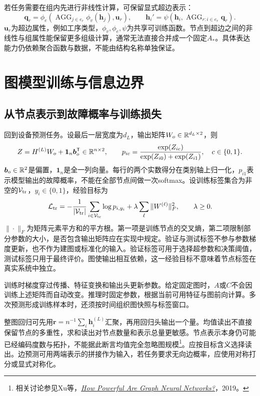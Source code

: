 若任务需要在组内先进行非线性计算，可保留显式超边表示：
\begin{equation}
 \bm q_r=\phi_e\!\left(\operatorname{AGG}_{j\in e_r}\phi_v(\bm h_j),\bm u_r\right),\qquad
 \bm h_i'=\psi\!\left(\bm h_i,\operatorname{AGG}_{r:i\in e_r}\bm q_r\right).
\end{equation}
$\bm u_r$为超边属性，例如工序类型，$\phi_v,\phi_e,\psi$为共享可训练函数。节点到超边之间的非线性与组属性能保留更多组级计算，通常无法直接合并成一个固定$A_*$。具体表达能力仍依赖聚合函数与数据，不能由结构名称单独保证。

\section{图模型训练与信息边界}
\subsection{从节点表示到故障概率与训练损失}
回到设备预测任务。设最后一层宽度为$d_L$，输出矩阵$W_o\in\mathbb{R}^{d_L\times2}$，则
\begin{equation}
 Z=H^{(L)}W_o+\bm1_n\bm b_o^{\mathsf T}\in\mathbb{R}^{n\times2},\qquad
 p_{ic}=\frac{\exp(Z_{ic})}{\exp(Z_{i0})+\exp(Z_{i1})},\quad c\in\{0,1\}.
\end{equation}
$\bm b_o\in\mathbb{R}^2$是偏置，$\bm1_n$是全一列向量。每行的两个实数得分在类别轴上归一化，$p_{i1}$表示模型输出的故障概率，不能在全部节点间做一次softmax。设训练标签集合为非空的$\mathcal V_{\rm tr}$，$y_i\in\{0,1\}$，经验目标为
\begin{equation}
 \mathcal L_{\rm tr}=-\frac1{|\mathcal V_{\rm tr}|}\sum_{i\in\mathcal V_{\rm tr}}\log p_{i,y_i}
 +\lambda\sum_\ell\|W^{(\ell)}\|_F^2,\qquad\lambda\geq0.
\end{equation}
$\|\cdot\|_F$为矩阵元素平方和的平方根。第一项是训练节点的交叉熵，第二项限制部分参数的大小，是否包含输出矩阵应在实现中规定。验证与测试标签不参与参数梯度更新，也不作为建图或标准化的输入。验证标签可用于选择超参数和决策阈值，测试标签只用于最终评价。图使输出相互依赖，这一经验目标不意味着节点标签在真实系统中独立。

训练时梯度穿过传播、特征变换和输出头更新参数。给定固定图时，$A$或$C$不会因训练上述矩阵而自动改变。推理时固定参数，根据当前可用特征与图前向计算。多次预测形成训练样本时，还须按时间组织图快照与标签窗口。

整图回归可先用$\bm r=n^{-1}\sum_i\bm h_i^{(L)}$汇聚，再用回归头输出一个量。均值读出不直接保留节点的多重性，求和读出对节点数量和表示总量更敏感。节点表示本身仍可能已经编码度数与拓扑，不能据此断言均值完全忽略图规模\footnote{相关讨论参见Xu等，\href{https://arxiv.org/abs/1810.00826}{\textit{How Powerful Are Graph Neural Networks?}}，2019。}。应按目标含义选择读出。边预测可用两端表示的拼接作为输入，若任务要求无向边概率，应使用对称打分或显式对称化。


